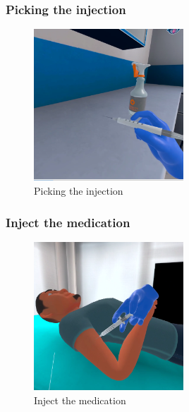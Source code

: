 \subsubsection{Picking the injection}
\begin{figure}[h]
	\centering
	\includegraphics[width=0.5\textwidth, height=0.3\textheight]{Images/Picking the injection.png}
	\caption{Picking the injection}
	\label{fig:Picking the injection}
\end{figure}

\subsubsection{Inject the medication}
\begin{figure}[h]
	\centering
	\includegraphics[width=0.5\textwidth, height=0.3\textheight]{Images/Inject the medication.png}
	\caption{Inject the medication}
	\label{fig:Inject the medication}
\end{figure}

